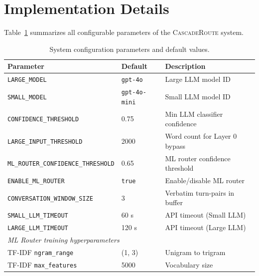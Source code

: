 \documentclass{article}
\newcommand{\system}{\textsc{CascadeRoute}}
\begin{document}




\appendix

\section{Implementation Details}
\label{app:impl}

Table~\ref{tab:config} summarizes all configurable parameters of the
\system{} system.

\begin{table}[h]
\caption{System configuration parameters and default values.}
\label{tab:config}
\centering
\begin{tabular}{lll}
\toprule
\textbf{Parameter} & \textbf{Default} & \textbf{Description} \\
\midrule
\texttt{LARGE\_MODEL}                    & \texttt{gpt-4o}         & Large LLM model ID \\
\texttt{SMALL\_MODEL}                    & \texttt{gpt-4o-mini}    & Small LLM model ID \\
\texttt{CONFIDENCE\_THRESHOLD}           & 0.75                    & Min LLM classifier confidence \\
\texttt{LARGE\_INPUT\_THRESHOLD}         & 2000                    & Word count for Layer 0 bypass \\
\texttt{ML\_ROUTER\_CONFIDENCE\_THRESHOLD} & 0.65                  & ML router confidence threshold \\
\texttt{ENABLE\_ML\_ROUTER}              & \texttt{true}           & Enable/disable ML router \\
\texttt{CONVERSATION\_WINDOW\_SIZE}      & 3                       & Verbatim turn-pairs in buffer \\
\texttt{SMALL\_LLM\_TIMEOUT}             & 60 s                    & API timeout (Small LLM) \\
\texttt{LARGE\_LLM\_TIMEOUT}             & 120 s                   & API timeout (Large LLM) \\
\midrule
\multicolumn{3}{l}{\textit{ML Router training hyperparameters}} \\
\midrule
TF-IDF \texttt{ngram\_range}             & (1, 3)                  & Unigram to trigram \\
TF-IDF \texttt{max\_features}            & 5000                    & Vocabulary size \\

\end{tabular}
\end{table}
\end{document}
